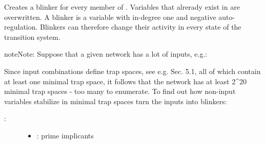 \documentclass[letterpaper,10pt,english]{sphinxmanual}
\begin{document}
\begin{fulllineitems}
\label{\detokenize{PrimeImplicants:PyBoolNet.PrimeImplicants.create_blinkers}}
Creates a blinker for every member of .
Variables that alrerady exist in  are overwritten.
A blinker is a variable with in-degree one and negative auto-regulation.
Blinkers can therefore change their activity in every state of the transition system.

\begin{sphinxadmonition}{note}{Note:}
Suppose that a given network has a lot of inputs, e.g.:

\begin{sphinxVerbatim}[commandchars=\\\{\}]
\end{sphinxVerbatim}

Since input combinations define trap spaces, see e.g. {\hyperref[\detokenize{Bibliography:klarner2015approx}]{}} Sec. 5.1,
all of which contain at least one minimal trap space,
it follows that the network has at least 2\textasciicircum{}20 minimal trap spaces - too many to enumerate.
To find out how non-input variables stabilize in minimal trap spaces turn the inputs into blinkers:

\begin{sphinxVerbatim}[commandchars=\\\{\}]
  
 
   
\end{sphinxVerbatim}
\end{sphinxadmonition}
\begin{description}
\item[{:}] \leavevmode\begin{itemize}
\item {} 
: prime implicants


\end{itemize}
\end{description}
\end{fulllineitems}
\end{document}
